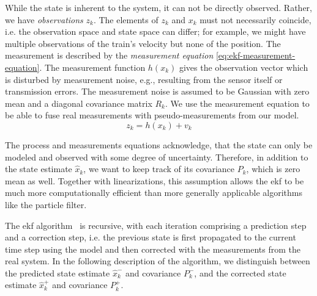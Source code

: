While the state is inherent to the system, it can not be directly observed. Rather, we have \textit{observations} $z_k$. The elements of $z_k$ and $x_k$ must not necessarily coincide, i.e. the observation space and state space can differ; for example, we might have multiple observations of the train's velocity but none of the position. The measurement is described by the \textit{measurement equation} \ref{eq:ekf-measurement-equation}. The measurement function $h(x_k)$ gives the observation vector which is disturbed by measurement noise, e.g., resulting from the sensor itself or transmission errors. The measurement noise is assumed to be Gaussian with zero mean and a diagonal covariance matrix $R_k$. We use the measurement equation to be able to fuse real measurements with pseudo-measurements from our model.
\begin{equation}\label{eq:ekf-measurement-equation}%
z_k = h(x_k) + v_k%
\end{equation}

The process and measurements equations acknowledge, that the state can only be modeled and observed with some degree of uncertainty. Therefore, in addition to the state estimate $\hat{x}_k$, we want to keep track of its covariance $P_k$, which is zero mean as well. Together with linearizations, this assumption allows the \gls{ekf} to be much more computationally efficient than more generally applicable algorithms like the particle filter.

The \gls{ekf} algorithm~\cite[p.~16~ff.]{Haykin.2001} is recursive, with each iteration comprising a prediction step and a correction step, i.e. the previous state is first propagated to the current time step using the model and then corrected with the measurements from the real system. In the following description of the algorithm, we distinguish between the predicted state estimate $\hat{x}_k^-$ and covariance $P_k^-$, and the corrected state estimate $\hat{x}_k^+$ and covariance $P_k^+$.

